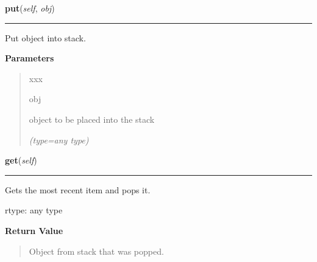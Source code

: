 \hspace{.8\funcindent}\begin{boxedminipage}{\funcwidth}

    \raggedright \textbf{put}(\textit{self}, \textit{obj})

    \vspace{-1.5ex}

    \rule{\textwidth}{0.5\fboxrule}
\setlength{\parskip}{2ex}
    Put object into stack.

\setlength{\parskip}{1ex}
      \textbf{Parameters}
      \vspace{-1ex}

      \begin{quote}
        \begin{Ventry}{xxx}

          \item[obj]

          object to be placed into the stack

            {\it (type=any type)}

        \end{Ventry}

      \end{quote}

    \end{boxedminipage}

    \label{UnBlockMe:Utility:Stack:Stack:get}

    \vspace{0.5ex}

\hspace{.8\funcindent}\begin{boxedminipage}{\funcwidth}

    \raggedright \textbf{get}(\textit{self})

    \vspace{-1.5ex}

    \rule{\textwidth}{0.5\fboxrule}
\setlength{\parskip}{2ex}
    Gets the most recent item and pops it.

    rtype:   any type

\setlength{\parskip}{1ex}
      \textbf{Return Value}
    \vspace{-1ex}

      \begin{quote}
      Object from stack that was popped.

      \end{quote}

    \end{boxedminipage}

